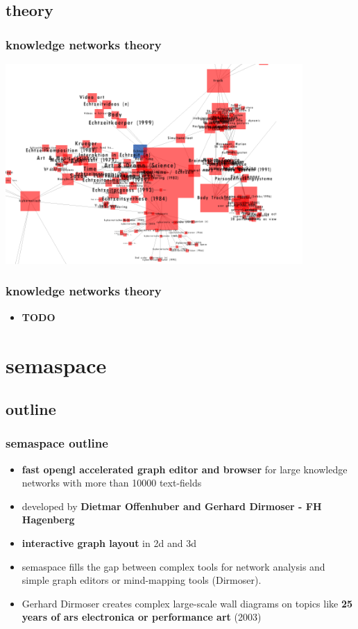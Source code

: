 \documentclass[blue]{beamer}
\begin{document}
\subsection{theory}
\frame
{
\frametitle{\textbf{knowledge networks theory}}
\includegraphics[width=0.85\textwidth]{bin/semaspace/semaspace.png}
}

\frame
{
\frametitle{\textbf{knowledge networks theory}}
\begin{itemize}
	\item \textbf{TODO} 
\end{itemize}
}





\section{semaspace}
\subsection{outline}
\frame
{
\frametitle{\textbf{semaspace outline}}
\begin{itemize}
	\item \textbf{fast opengl accelerated graph editor and browser} for large knowledge networks with more than 10000 text-fields
	\item developed by \textbf{Dietmar Offenhuber and Gerhard Dirmoser - FH Hagenberg}
	\item \textbf{interactive graph layout} in 2d and 3d
	\item semaspace fills the gap between complex tools for network analysis and simple graph editors or mind-mapping tools (Dirmoser).
	\item Gerhard Dirmoser creates complex large-scale wall diagrams on topics like \textbf{25 years of ars electronica or performance art} (2003)
\end{itemize}
}
\end{document}
